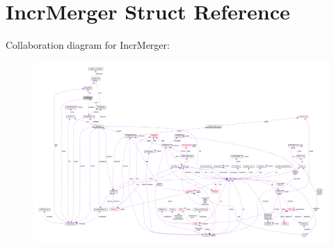 \hypertarget{structIncrMerger}{}\section{Incr\+Merger Struct Reference}
\label{structIncrMerger}


Collaboration diagram for Incr\+Merger\+:\nopagebreak
\begin{figure}[H]
\begin{center}
\leavevmode
\includegraphics[width=350pt]{structIncrMerger__coll__graph}
\end{center}
\end{figure}
